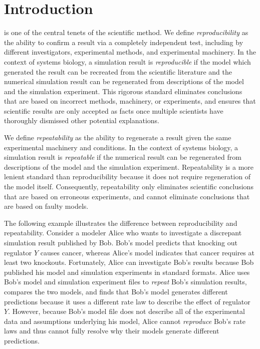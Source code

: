 \documentclass[journal,transmag,twoside]{IEEEtran}
\begin{document}
\section{Introduction}
% 
% 
% 
% 
 is one of the central tenets of the scientific method.
We define \textit{reproducibility} as the ability to confirm a result via a completely independent test, including by different investigators, experimental methods, and experimental machinery. In the context of systems biology, a simulation result is \textit{reproducible} if the model which generated the result can be recreated from the scientific literature and the numerical simulation result can be regenerated from descriptions of the model and the simulation experiment.
This rigorous standard eliminates conclusions that are based on incorrect methods, machinery, or experiments, and ensures that scientific results are only accepted as facts once multiple scientists have thoroughly dismissed other potential explanations. 

We define \textit{repeatability} as the ability to regenerate a result given the same experimental machinery and conditions. In the context of systems biology, a simulation result is \textit{repeatable} if the numerical result can be regenerated from descriptions of the model and the simulation experiment.
Repeatability is a more lenient standard than reproducibility because it does not require regeneration of the model itself. 
Consequently, repeatability only eliminates scientific conclusions that are based on erroneous experiments, and cannot eliminate conclusions that are based on faulty models.

The following example illustrates the difference between reproducibility and repeatability. Consider a modeler Alice who wants to investigate a discrepant simulation result published by Bob. Bob's model predicts that knocking out regulator $Y$ causes cancer, whereas Alice's model indicates that cancer requires at least two knockouts. Fortunately, Alice can investigate Bob's results because Bob published his model and simulation experiments in standard formats. Alice uses Bob's model and simulation experiment files to \textit{repeat} Bob's simulation results, compares the two models, and finds that Bob's model generates different predictions because it uses a different rate law to describe the effect of regulator $Y$. However, because Bob's model file does not describe all of the experimental data and assumptions underlying his model, Alice cannot \textit{reproduce} Bob's rate laws and thus cannot fully resolve why their models generate different predictions.
\end{document}
